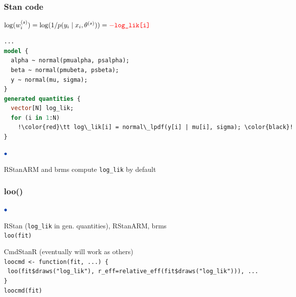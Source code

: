 \documentclass[english,t]{beamer}
\newenvironment{list1}{
   \begin{list}{$\color{list1}\bullet$}{\itemsep=6pt}}{
  \end{list}}
\begin{document}
\begin{frame}[fragile]
  \frametitle{Stan code }

  \vspace{\baselineskip}
  $ \log(w_i^{(s)}) = \log(1/p(y_i \mid x_i,\theta^{(s)})) = {\color{red}-\texttt{log\_lik[i]}}$
  \vspace{\baselineskip}

  \pause
  {\small
\begin{lstlisting}[language=Stan,escapechar=!]
...
model {
  alpha ~ normal(pmualpha, psalpha);
  beta ~ normal(pmubeta, psbeta);
  y ~ normal(mu, sigma);
}
generated quantities {
  vector[N] log_lik;
  for (i in 1:N)
    !\color{red}\tt log\_lik[i] = normal\_lpdf(y[i] | mu[i], sigma); \color{black}!
}
\end{lstlisting}
  }

  \begin{list1}
  \item<3-> RStanARM and brms compute {\color{red}\texttt{log\_lik}} by default
  \end{list1}
  
\end{frame}

\begin{frame}[fragile]
  \frametitle{loo()}

  \begin{list1}
  \item RStan (\texttt{log\_lik} in gen. quantities), RStanARM, brms\\
    \texttt{loo(fit)}
  \item<2-> CmdStanR (eventually will work as others)\\
    \texttt{loocmd <- function(fit, ...) \{}\\
    \texttt{  loo(fit\$draws("log\_lik"), r\_eff=relative\_eff(fit\$draws("log\_lik"))), ...}\\
    \texttt{\}}\\
    \texttt{loocmd(fit)}
  \end{list1}
  
\end{frame}
\end{document}
